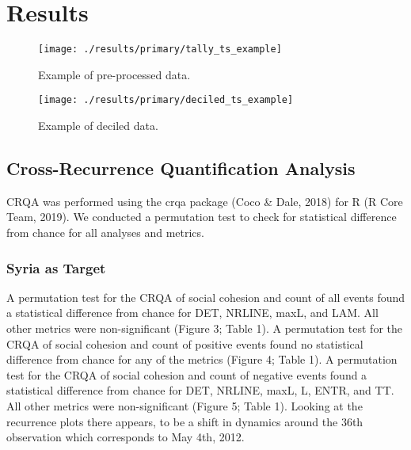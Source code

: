 \documentclass[english,man]{apa6}
\begin{document}
\hypertarget{results}{%
\section{Results}\label{results}}

\begin{figure}
\texttt{[image: ./results/primary/tally\_ts\_example]} \caption{Example of pre-processed data.}\label{fig:raw-ts}
\end{figure}

\begin{figure}
\texttt{[image: ./results/primary/deciled\_ts\_example]} \caption{Example of deciled data.}\label{fig:deciled-ts}
\end{figure}

\hypertarget{cross-recurrence-quantification-analysis-1}{%
\subsection{Cross-Recurrence Quantification Analysis}\label{cross-recurrence-quantification-analysis-1}}

CRQA was performed using the crqa package (Coco \& Dale, 2018) for R (R Core Team, 2019). We conducted a permutation test to check for statistical difference from chance for all analyses and metrics.

\hypertarget{syria-as-target}{%
\subsubsection{Syria as Target}\label{syria-as-target}}

A permutation test for the CRQA of social cohesion and count of all events found a statistical difference from chance for DET, NRLINE, maxL, and LAM. All other metrics were non-significant (Figure 3; Table 1). A permutation test for the CRQA of social cohesion and count of positive events found no statistical difference from chance for any of the metrics (Figure 4; Table 1). A permutation test for the CRQA of social cohesion and count of negative events found a statistical difference from chance for DET, NRLINE, maxL, L, ENTR, and TT. All other metrics were non-significant (Figure 5; Table 1). Looking at the recurrence plots there appears, to be a shift in dynamics around the 36th observation which corresponds to May 4th, 2012.
\end{document}
